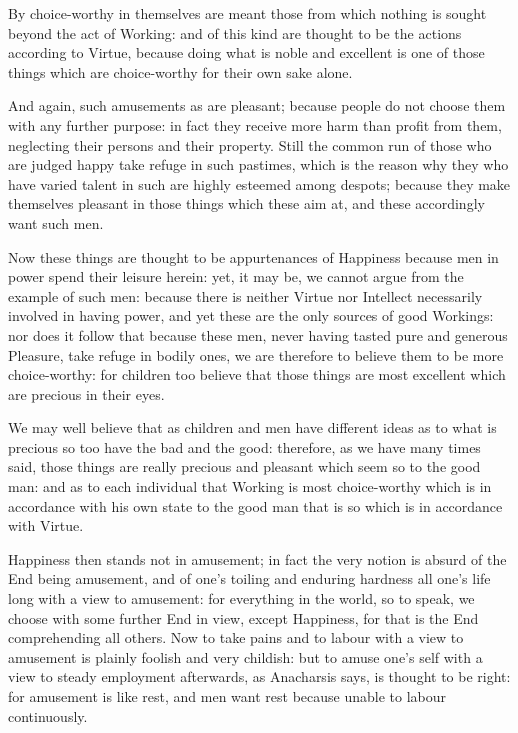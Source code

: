 By choice-worthy in themselves are meant those from which nothing is sought
beyond the act of Working: and of this kind are thought to be the actions
according to Virtue, because doing what is noble and excellent is one of those
things which are choice-worthy for their own sake alone.

And again, such amusements as are pleasant; because people do not choose them
with any further purpose: in fact they receive more harm than profit from them,
neglecting their persons and their property. Still the common run of those who
are judged happy take refuge in such pastimes, which is the reason why they who
have varied talent in such are highly esteemed among despots; because they make
themselves pleasant in those things which these aim at, and these accordingly
want such men.

Now these things are thought to be appurtenances of Happiness because men in
power spend their leisure herein: yet, it may be, we cannot argue from the
example of such men: because there is neither Virtue nor Intellect necessarily
involved in having power, and yet these are the only sources of good Workings:
nor does it follow that because these men, never having tasted pure and
generous Pleasure, take refuge in bodily ones, we are therefore to believe them
to be more choice-worthy: for children too believe that those things are most
excellent which are precious in their eyes.

We may well believe that as children and men have different ideas as to what is
precious so too have the bad and the good: therefore, as we have many times
said, those things are really precious and pleasant which seem so to the good
man: and as to each individual that Working is most choice-worthy which is in
accordance with his own state to the good man that is so which is in accordance
with Virtue.

Happiness then stands not in amusement; in fact the very notion is absurd of
the End being amusement, and of one’s toiling and enduring hardness all
one’s life long with a view to amusement: for everything in the world, so
to speak, we choose with some further End in view, except Happiness, for that
is the End comprehending all others. Now to take pains and to labour with a
view to amusement is plainly foolish and very childish: but to amuse
one’s self with a view to steady employment afterwards, as Anacharsis
says, is thought to be right: for amusement is like rest, and men want rest
because unable to labour continuously.


